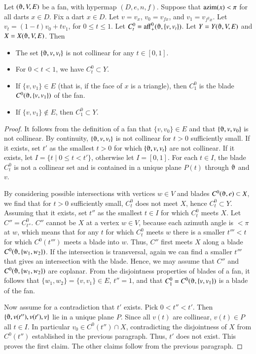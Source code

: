 \begin{lemma}[sweep]\label{lemma:sweep}  
Let $(\orgn,V,E)$ be a fan, with hypermap $(D,e,n,f)$.  
Suppose that ${\operatorname{azim}}(x)<\pi$
for all darts $x\in D$.  Fix a dart $x\in D$.
Let $v = v_x$, $v_0 = v_{f x}$,
and $v_1 = v_{f^2 x}$.  Let $v_t = (1-t) v_0 + t v_1$, for
$0\le t\le 1$.  Let $C_t^0 = \op{aff}_+^0(\orgn,\{v,v_t\})$.
Let $Y = Y(\orgn,V,E)$ and $X = X(\orgn,V,E)$.
Then
\begin{itemize}
\item The set $\{\orgn,v,v_t\}$ is not collinear for any $t\in[0,1]$.
\item For $0< t < 1$, we have $C_t^0\subset Y$.
\item If $\{v,v_1\}\in E$ (that is, if the face of $x$ is a triangle), 
then $C_1^0$ is the blade $C^0(\orgn,\{v,v_1\})$ of the fan.
\item If $\{v,v_1\}\not\in E$, then $C_1^0\subset Y$.
\end{itemize}
\end{lemma}

\begin{proof}
It follows from the definition of a fan that $\{v,v_0\}\in E$ and
that $\{\orgn,v,v_0\}$ is not collinear.  By continuity, $\{\orgn,v,v_t\}$
is not collinear for $t>0$ sufficiently small.  If it exists, set $t'$ as
the smallest $t>0$ for which $\{\orgn,v,v_t\}$ are not collinear.  If it exists,
let $I=\{t\mid 0\le t < t'\}$, otherwise let $I=[0,1]$.  For
each $t\in I$, the blade $C_t^0$ is not a collinear set and is contained in a unique plane $P(t)$ through $\orgn$ and $v$.

By considering possible intersections with vertices $w\in V$ and blades
$C^0(\orgn,e)\subset X$, we find that for $t>0$ sufficiently small,
$C^0_t$ does not meet $X$, hence $C^0_t\subset Y$.  Assuming 
that it exists, set $t''$
as the smallest $t\in I$ for which $C^0_t$ meets $X$.   Let $C'' = C_{t''}^0$.
$C''$ cannot be $X$ at a vertex $w\in V$, because each azimuth angle
is $<\pi$ at $w$, which means that for any $t$ for which  $C^0_t$ meets $w$ 
there is a smaller $t'''<t$ for which $C^0(t''')$ meets a blade into $w$.
Thus, $C''$ first meets $X$ along a blade $C^0(\orgn,\{w_1,w_2\})$. If
the intersection is transversal, again we can find a smaller $t'''$ that
gives an intersection with the blade.  Hence, we may assume that
$C''$ and $C^0(\orgn,\{w_1,w_2\})$ are coplanar.  From the disjointness
properties of blades of a fan, it follows that $\{w_1,w_2\} = \{v,v_1\}\in E$,
$t''=1$,
and that $C_1^0=C^0(\orgn,\{v,v_1\})$ is a blade of the fan.

Now assume for a contradiction that $t'$ exists.  Pick $0<t''<t'$.  Then
$\{\orgn,v(t''),v(t'),v\}$ lie in a unique plane $P$.  Since all $v(t)$
are collinear,  $v(t)\in P$ all $t\in I$.  In particular $v_0\in C^0(t'')\cap X$,
contradicting the disjointness of $X$ from $C^0(t'')$ established in
the previous paragraph.  Thus, $t'$ does not exist.  This proves the first
claim.  The other claims follow from the previous paragraph.
\end{proof}

